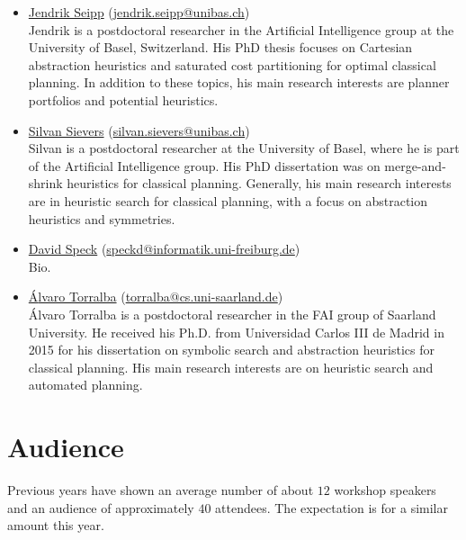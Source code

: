 \documentclass[10pt]{article}
\begin{document}
\begin{itemize}
\item \href{https://ai.dmi.unibas.ch/people/seipp}{Jendrik Seipp}
(\href{mailto:jendrik.seipp@unibas.ch}{jendrik.seipp@unibas.ch})\\
Jendrik is a postdoctoral researcher in the Artificial Intelligence
group at the University of Basel, Switzerland. His PhD thesis focuses
on Cartesian abstraction heuristics and saturated cost partitioning
for optimal classical planning. In addition to these topics, his main
research interests are planner portfolios and potential heuristics.

\item \href{https://ai.dmi.unibas.ch/people/}{Silvan Sievers}
(\href{mailto:silvan.sievers@unibas.ch}{silvan.sievers@unibas.ch})\\
Silvan is a postdoctoral researcher at the University of Basel, where he is
part of the Artificial Intelligence group. His PhD dissertation was on
merge-and-shrink heuristics for classical planning. Generally, his main
research interests are in heuristic search for classical planning, with a focus
on abstraction heuristics and symmetries.

\item \href{http://}{David Speck}
(\href{mailto:speckd@informatik.uni-freiburg.de}{speckd@informatik.uni-freiburg.de})\\
Bio.

\item \href{http://}{{\'A}lvaro Torralba}
  (\href{mailto:torralba@cs.uni-saarland.de}{torralba@cs.uni-saarland.de})\\
  \'Alvaro Torralba is a postdoctoral researcher in the FAI group of Saarland
  University. He received his Ph.D. from Universidad Carlos III de Madrid in 2015 for his
  dissertation on symbolic search and abstraction heuristics for classical planning. His
  main research interests are on heuristic search and automated planning.


\end{itemize}

\section*{Audience}
Previous years have shown an average number of about $12$ workshop
speakers and an audience of approximately $40$ attendees. The
expectation is for a similar amount this year.
\end{document}
